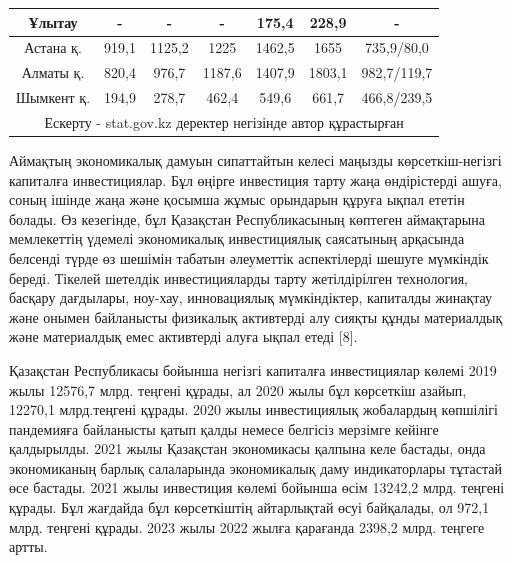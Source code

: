 \begin{table}[H]
{\begin{tabular}{|ccccccc|}
\multicolumn{1}{|c|}{Ұлытау} &
  \multicolumn{1}{c|}{-} &
  \multicolumn{1}{c|}{-} &
  \multicolumn{1}{c|}{-} &
  \multicolumn{1}{c|}{175,4} &
  \multicolumn{1}{c|}{228,9} &
  - \\ \hline
\multicolumn{1}{|c|}{Астана қ.} &
  \multicolumn{1}{c|}{919,1} &
  \multicolumn{1}{c|}{1125,2} &
  \multicolumn{1}{c|}{1225} &
  \multicolumn{1}{c|}{1462,5} &
  \multicolumn{1}{c|}{1655} &
  735,9/80,0 \\ \hline
\multicolumn{1}{|c|}{Алматы қ.} &
  \multicolumn{1}{c|}{820,4} &
  \multicolumn{1}{c|}{976,7} &
  \multicolumn{1}{c|}{1187,6} &
  \multicolumn{1}{c|}{1407,9} &
  \multicolumn{1}{c|}{1803,1} &
  982,7/119,7 \\ \hline
\multicolumn{1}{|c|}{Шымкент қ.} &
  \multicolumn{1}{c|}{194,9} &
  \multicolumn{1}{c|}{278,7} &
  \multicolumn{1}{c|}{462,4} &
  \multicolumn{1}{c|}{549,6} &
  \multicolumn{1}{c|}{661,7} &
  466,8/239,5 \\ \hline
\multicolumn{7}{|c|}{Ескерту - stat.gov.kz деректер негізінде автор құрастырған} \\ \hline
\end{tabular}%
}
\end{table}

\begin{multicols}{2}
Аймақтың экономикалық дамуын сипаттайтын келесі маңызды
көрсеткіш-негізгі капиталға инвестициялар. Бұл өңірге инвестиция тарту
жаңа өндірістерді ашуға, соның ішінде жаңа және қосымша жұмыс орындарын
құруға ықпал ететін болады. Өз кезегінде, бұл Қазақстан Республикасының
көптеген аймақтарына мемлекеттің үдемелі экономикалық инвестициялық
саясатының арқасында белсенді түрде өз шешімін табатын әлеуметтік
аспектілерді шешуге мүмкіндік береді. Тікелей шетелдік инвестицияларды
тарту жетілдірілген технология, басқару дағдылары, ноу-хау, инновациялық
мүмкіндіктер, капиталды жинақтау және онымен байланысты физикалық
активтерді алу сияқты құнды материалдық және материалдық емес активтерді
алуға ықпал етеді {[}8{]}.

Қазақстан Республикасы бойынша негізгі капиталға инвестициялар көлемі
2019 жылы 12576,7 млрд. теңгені құрады, ал 2020 жылы бұл көрсеткіш
азайып, 12270,1 млрд.теңгені құрады. 2020 жылы инвестициялық жобалардың
көпшілігі пандемияға байланысты қатып қалды немесе белгісіз мерзімге
кейінге қалдырылды. 2021 жылы Қазақстан экономикасы қалпына келе
бастады, онда экономиканың барлық салаларында экономикалық даму
индикаторлары тұтастай өсе бастады. 2021 жылы инвестиция көлемі бойынша
өсім 13242,2 млрд. теңгені құрады. Бұл жағдайда бұл көрсеткіштің
айтарлықтай өсуі байқалады, ол 972,1 млрд. теңгені құрады. 2023 жылы
2022 жылға қарағанда 2398,2 млрд. теңгеге артты.
\end{multicols}

